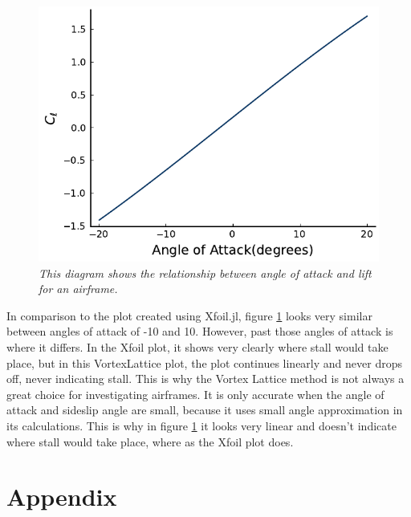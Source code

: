 \documentclass{journal}
\begin{document}
	\begin{figure}[H]
		\centering
		\includegraphics{../graphics/aoa-lift.pdf}
		\caption{\emph{This diagram shows the relationship between angle of attack and lift for an airframe.}}
		\label{fig:aoa-lift}
	\end{figure}

	In comparison to the plot created using Xfoil.jl, figure \ref{fig:aoa-lift} looks very similar between angles of attack of -10 and 10. However, past those angles of attack is where it differs. In the Xfoil plot, it shows very clearly where stall would take place, but in this VortexLattice plot, the plot continues linearly and never drops off, never indicating stall. This is why the Vortex Lattice method is not always a great choice for investigating airframes. It is only accurate when the angle of attack and sideslip angle are small, because it uses small angle approximation in its calculations. This is why in figure \ref{fig:aoa-lift} it looks very linear and doesn't indicate where stall would take place, where as the Xfoil plot does.
 	
	\section*{Appendix}
	
\end{document}
